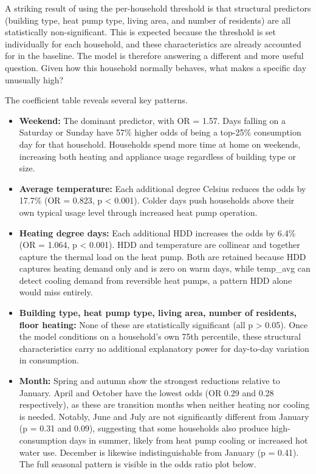 \documentclass[
]{article}
\providecommand{\tightlist}{%
  \setlength{\itemsep}{0pt}\setlength{\parskip}{0pt}}
\begin{document}
A striking result of using the per-household threshold is that
structural predictors (building type, heat pump type, living area, and
number of residents) are all statistically non-significant. This is
expected because the threshold is set individually for each household,
and these characteristics are already accounted for in the baseline. The
model is therefore answering a different and more useful question. Given
how this household normally behaves, what makes a specific day unusually
high?

The coefficient table reveals several key patterns.

\begin{itemize}
\tightlist
\item
  \textbf{Weekend:} The dominant predictor, with OR = 1.57. Days falling
  on a Saturday or Sunday have 57\% higher odds of being a top-25\%
  consumption day for that household. Households spend more time at home
  on weekends, increasing both heating and appliance usage regardless of
  building type or size.
\item
  \textbf{Average temperature:} Each additional degree Celsius reduces
  the odds by 17.7\% (OR = 0.823, p \textless{} 0.001). Colder days push
  households above their own typical usage level through increased heat
  pump operation.
\item
  \textbf{Heating degree days:} Each additional HDD increases the odds
  by 6.4\% (OR = 1.064, p \textless{} 0.001). HDD and temperature are
  collinear and together capture the thermal load on the heat pump. Both
  are retained because HDD captures heating demand only and is zero on
  warm days, while temp\_avg can detect cooling demand from reversible
  heat pumps, a pattern HDD alone would miss entirely.
\item
  \textbf{Building type, heat pump type, living area, number of
  residents, floor heating:} None of these are statistically significant
  (all p \textgreater{} 0.05). Once the model conditions on a
  household's own 75th percentile, these structural characteristics
  carry no additional explanatory power for day-to-day variation in
  consumption.
\item
  \textbf{Month:} Spring and autumn show the strongest reductions
  relative to January. April and October have the lowest odds (OR 0.29
  and 0.28 respectively), as these are transition months when neither
  heating nor cooling is needed. Notably, June and July are not
  significantly different from January (p = 0.31 and 0.09), suggesting
  that some households also produce high-consumption days in summer,
  likely from heat pump cooling or increased hot water use. December is
  likewise indistinguishable from January (p = 0.41). The full seasonal
  pattern is visible in the odds ratio plot below.
\end{itemize}
\end{document}
